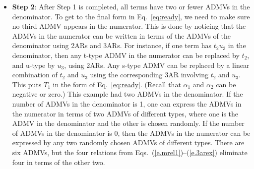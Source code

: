 \documentclass[prd,preprintnumbers,nofootinbib,superscriptaddress,onecolumn,preprint]{revtex4-1}
\newcommand\3[1]{\boldsymbol{#1}}
\newcommand{\no}{\nonumber \\}
\newcommand{\parz}[1]{\ensuremath{\left(#1\right)}}
\newcommand{\eref}[1]{Eq.~(\ref{e.#1})}
\newcommand{\erefs}[2]{Eqs.~(\ref{e.#1})--(\ref{e.#2})}
\begin{document}
\begin{itemize}
\begin{itemize}
\begin{align}
                  &= \frac{s}{t_3 u_2 \parz{u_1- s_{23} - Q^2} } 
                   + \frac{s}{t_2 u_2 \parz{u_1- s_{23} - Q^2} }\, .
            \end{align}
       \item[] \textbf{Substep 2}: After Substep 1 is done for all three types, the
       leftover terms have denominators with at most three ADMVs, all from
       different types. For terms with two or fewer ADMVs in the denominator,
       nothing more needs to be done in this step.  For terms with three
       ADMVs in the denominator, one may write a 3AR in the form
       of~\eref{unity} and reduce the number of ADMVs in the denominator to
       two or fewer in a way similar to Substep 1. For example, say that 
       \begin{equation}
       T_1 = \frac{1}{s_{13} u_2 t_2} \, .
       \end{equation}
       Then it is possible to eliminate $s_{13}$, $u_2$ and $t_2$ by
       using~\eref{3arex} to construct~\eref{unity}. Then,
       \begin{align}
       T_1 &{}= \parz{ \frac{1}{s_{13} u_2 t_2} } \parz{\frac{s + Q^2}{s + Q^2}} \no
       &{}= \parz{ \frac{1}{s_{13} u_2 t_2} } \parz{\frac{s_{13} - t_2 - u_2}{s + Q^2}}  \no
       &{}= \frac{1}{u_2 t_2} \frac{1}{\parz{s + Q^2}} 
           - \frac{1}{s_{13} u_2} \frac{1}{\parz{s + Q^2}}
           - \frac{1}{s_{13} t_2} \frac{1}{\parz{s + Q^2}} \, .
       \end{align}
    \end{itemize}
\item[] \textbf{Step 2}: After Step 1 is completed, all terms have two or fewer
      ADMVs in the denominator. To get to the final form in
      Eq.~\eqref{eq:ready}, we need to make sure no third ADMV
      appears in the numerator. This is
      done by noticing that the ADMVs in the numerator can be written in
      terms of the ADMVs of the denominator using 2ARs and 3ARs.  For
      instance, if one term has $t_2u_3$ in the denominator, then any t-type
      ADMV in the numerator can be replaced by $t_2$, and u-type by $u_3$,
      using 2ARs. Any s-type ADMV can be replaced by a linear combination of
      $t_2$ and $u_3$ using the corresponding 3AR involving $t_2$ and $u_3$.
      This puts $T_1$ in the form of Eq.~\eqref{eq:ready}. (Recall
      that $\alpha_1$ and $\alpha_2$ can be negative or zero.) This example
      had two ADMVs in the denominator. If the number of ADMVs in the
      denominator is 1, one can express the ADMVs in the numerator in terms
      of two ADMVs of different types, where one is the ADMV in the
      denominator and the other is chosen randomly. If the number of ADMVs
      in the denominator is 0, then the ADMVs in the numerator can be
      expressed by any two randomly chosen ADMVs of different types.
      There are six ADMVs, but the four relations from
      \erefs{mrel1}{3arex} eliminate four in terms of the other two.
\end{itemize}
\end{document}

